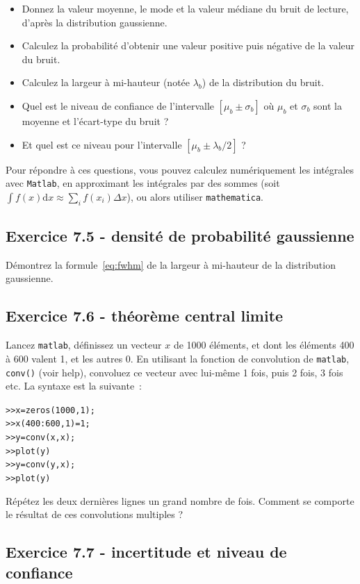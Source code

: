 \begin{itemize}
\item Donnez la valeur moyenne, le mode et la valeur médiane du bruit de lecture, d'après la distribution gaussienne.
\item Calculez la probabilité d'obtenir une valeur positive puis négative de la valeur du bruit.
\item Calculez la largeur à mi-hauteur (notée $\lambda_b$) de la distribution du bruit.
\item Quel est le niveau de confiance de l'intervalle $[\mu_b\pm\sigma_b]$ où $\mu_b$ et $\sigma_b$ sont la moyenne et l'écart-type du bruit ?
\item Et quel est ce niveau pour l'intervalle $[\mu_b\pm\lambda_b/2]$ ?
\end{itemize}
Pour répondre à ces questions, vous pouvez calculez numériquement les intégrales avec \texttt{Matlab}, en approximant les intégrales par des sommes (soit $\int f(x)\text{d}x\approx\sum_if(x_i)\Delta x$), ou alors utiliser \texttt{mathematica}.

\subsection*{Exercice 7.5 - densité de probabilité gaussienne}

Démontrez la formule~\ref{eq:fwhm} de la largeur à mi-hauteur de la distribution gaussienne.

\subsection*{Exercice 7.6 - théorème central limite}

Lancez \texttt{matlab}, définissez un vecteur $x$ de 1000 éléments, et dont les éléments 400 à 600 valent 1, et les autres 0. En utilisant la fonction de convolution de \texttt{matlab}, \texttt{conv()} (voir help), convoluez ce vecteur avec lui-même 1 fois, puis 2 fois, 3 fois etc. La syntaxe est la suivante~:
\begin{alltt}
>> x=zeros(1000,1);
>> x(400:600,1)=1;
>> y=conv(x,x);
>> plot(y)
>> y=conv(y,x);
>> plot(y)
\end{alltt}
Répétez les deux dernières lignes un grand nombre de fois. Comment se comporte le résultat de ces convolutions multiples ?

\newpage
\subsection*{Exercice 7.7 - incertitude et niveau de confiance}

